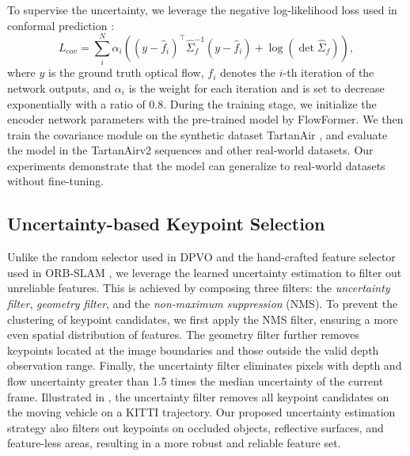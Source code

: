 To supervise the uncertainty, we leverage the negative log-likelihood loss used in conformal prediction \cite{russell2021multivariate, ConformalPrediction, qiu2023airimu}:
\begin{equation}
     L_{cov} = \sum_i^N \alpha_i \left((y - \hat{f}_i)^\top \hat{\Sigma}_{f}^{-1} (y - \hat{f}_i) + \log (\det \hat{\Sigma}_f) \right),
\end{equation}
where $y$ is the ground truth optical flow, $f_i$ denotes the $i$-th iteration of the network outputs, and $\alpha_i$ is the weight for each iteration and is set to decrease exponentially with a ratio of $0.8$.
During the training stage, we initialize the encoder network parameters with the pre-trained model by FlowFormer.
We then train the covariance module on the synthetic dataset TartanAir \cite{tartanair2020iros}, and evaluate the model in the TartanAirv2 sequences and other real-world datasets.
Our experiments demonstrate that the model can generalize to real-world datasets without fine-tuning.




\subsection{Uncertainty-based Keypoint Selection}
\label{Method: keypointslection}

Unlike the random selector used in DPVO\cite{teed2024deep} and the hand-crafted feature selector used in ORB-SLAM \cite{orb2011}, we leverage the learned uncertainty estimation to filter out unreliable features. 
This is achieved by composing three filters: the \textit{uncertainty filter}, \textit{geometry filter}, and the \textit{non-maximum suppression} (NMS).
To prevent the clustering of keypoint candidates, we first apply the NMS filter, ensuring a more even spatial distribution of features.
The geometry filter further removes keypoints located at the image boundaries and those outside the valid depth observation range.
Finally, the uncertainty filter eliminates pixels with depth and flow uncertainty greater than 1.5 times the median uncertainty of the current frame.
Illustrated in , the uncertainty filter removes all keypoint candidates on the moving vehicle on a KITTI trajectory. 
Our proposed uncertainty estimation strategy also filters out keypoints on occluded objects, reflective surfaces, and feature-less areas, resulting in a more robust and reliable feature set.

